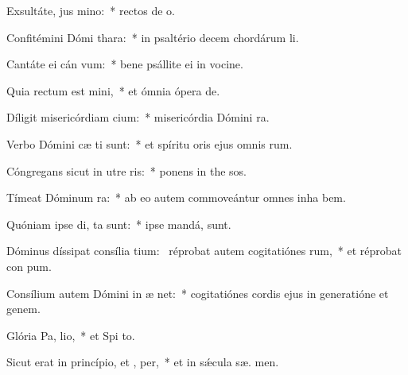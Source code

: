 \item Exsultáte, jus  mino:~* rectos de o.
\item Confitémini Dómi  thara:~* in psaltério decem chordárum  li.
\item Cantáte ei cán vum:~* bene psállite ei in vocine.
\item Quia rectum est  mini,~* et ómnia ópera   de.
\item Díligit misericórdiam  cium:~* misericórdia Dómini   ra.
\item Verbo Dómini cæ ti sunt:~* et spíritu oris ejus omnis  rum.
\item Cóngregans sicut in utre  ris:~* ponens in the sos.
\item Tímeat Dóminum  ra:~* ab eo autem commoveántur omnes inha bem.
\item Quóniam ipse di,  ta sunt:~* ipse mandá,   sunt.
\item Dóminus díssipat consília tium:~\pscross{} réprobat autem cogitatiónes rum,~* et réprobat con pum.
\item Consílium autem Dómini in æ net:~* cogitatiónes cordis ejus in generatióne et genem.
\item Glória Pa,  lio,~* et Spi to.
\item Sicut erat in princípio, et ,  per,~* et in sǽcula sæ. men.
